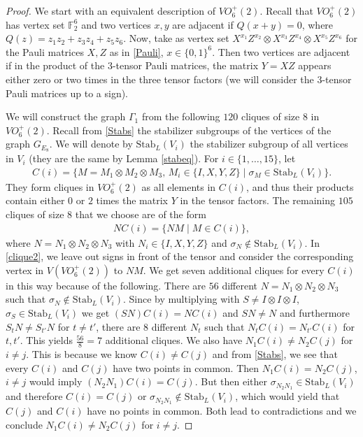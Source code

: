\documentclass[11pt]{article}
\theoremstyle{definition}
\numberwithin{equation}{section}
\newcommand{\F}{\mathbb{F}}
\begin{document}
\begin{proof}
We start with an equivalent description of $VO_6^+(2)$. Recall that $VO_6^+(2)$ has vertex set $\F_2^6$ and two vertices $x,y$ are adjacent if $Q(x+y)=0$, where $Q(z)=z_1z_2+z_3z_4+z_5z_6$. Now, take as vertex set $X^{x_1}Z^{x_2}\otimes X^{x_3}Z^{x_4}\otimes X^{x_5}Z^{x_6}$ for the Pauli matrices $X, Z$ as in \eqref{Pauli}, $x\in \{0,1\}^6$. Then two vertices are adjacent if in the product of the $3$-tensor Pauli matrices, the matrix $Y=XZ$ appears either zero or two times in the three tensor factors (we will consider the $3$-tensor Pauli matrices up to a sign). 

We will construct the graph $\Gamma_1$ from the following $120$ cliques of size $8$ in $VO_6^+(2)$. 
Recall from \eqref{Stabs} the stabilizer subgroups of the vertices of the graph $G_{E_8}$. We will denote by $\mathrm{Stab}_L(V_i)$ the stabilizer subgroup of all vertices in $V_i$ (they are the same by Lemma \ref{stabeq}). For $i \in \{1,\dots, 15\}$, let 
\begin{align}\label{clique1}
   C(i)=\{M=M_1\otimes M_2 \otimes M_3,\, M_i\in \{I,X,Y,Z\} \mid \sigma_M \in \mathrm{Stab}_L(V_i)\}.
\end{align}
They form cliques in $VO_6^+(2)$ as all elements in $C(i)$, and thus their products contain either $0$ or $2$ times the matrix $Y$ in the tensor factors. The remaining $105$ cliques of size $8$ that we choose are of the form
\begin{align}\label{clique2}
    NC(i)=\{NM \mid M \in C(i)\},
\end{align}
where $N=N_1\otimes N_2 \otimes N_3$ with $N_i\in \{I,X,Y,Z\}$ and $\sigma_N \notin \mathrm{Stab}_L(V_i)$. In \eqref{clique2}, we leave out signs in front of the tensor and consider the corresponding vertex in $V(VO_6^+(2))$ to $NM$. We get seven additional cliques for every $C(i)$ in this way because of the following. There are $56$ different $N=N_1\otimes N_2 \otimes N_3$ such that $\sigma_N \notin \mathrm{Stab}_L(V_i)$. Since by multiplying with $S\neq I\otimes I \otimes I$, $\sigma_S \in \mathrm{Stab}_L(V_i)$ we get $(SN)C(i)=NC(i)$ and $SN\neq N$ and furthermore $S_tN\neq S_{t'}N$ for $t\neq t'$, there are $8$ different $N_t$ such that $N_tC(i)=N_{t'}C(i)$ for $t,t'$. This yields $\frac{56}{8}=7$ additional cliques. We also have $N_1C(i)\neq N_2C(j)$ for $i\neq j$. This is because we know $C(i)\neq C(j)$ and from \eqref{Stabs}, we see that every $C(i)$ and $C(j)$ have two points in common. Then $N_1C(i)=N_2C(j)$, $i\neq j$ would imply $(N_2N_1)C(i)=C(j)$. But then either $\sigma_{N_2N_1}\in \mathrm{Stab}_L(V_i)$ and therefore $C(i)=C(j)$ or $\sigma_{N_2N_1}\notin \mathrm{Stab}_L(V_i)$, which would yield that $C(j)$ and $C(i)$ have no points in common. Both lead to contradictions and we conclude $N_1C(i)\neq N_2C(j)$ for $i\neq j$.
 

\end{proof}
\end{document}
